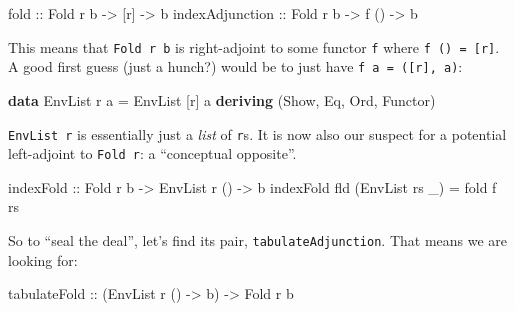 \documentclass[]{article}
\newenvironment{Shaded}{}{}
\newcommand{\DataTypeTok}[1]{\textcolor[rgb]{0.56,0.13,0.00}{#1}}
\newcommand{\KeywordTok}[1]{\textcolor[rgb]{0.00,0.44,0.13}{\textbf{#1}}}
\newcommand{\NormalTok}[1]{#1}
\newcommand{\OtherTok}[1]{\textcolor[rgb]{0.00,0.44,0.13}{#1}}
\begin{document}
\begin{Shaded}
\begin{Highlighting}[]
\OtherTok{fold            ::} \DataTypeTok{Fold}\NormalTok{ r b }\OtherTok{{-}>}\NormalTok{ [r]  }\OtherTok{{-}>}\NormalTok{ b}
\OtherTok{indexAdjunction ::} \DataTypeTok{Fold}\NormalTok{ r b }\OtherTok{{-}>}\NormalTok{ f () }\OtherTok{{-}>}\NormalTok{ b}
\end{Highlighting}
\end{Shaded}

This means that \texttt{Fold\ r\ b} is right-adjoint to some functor \texttt{f}
where \texttt{f\ ()\ =\ {[}r{]}}. A good first guess (just a hunch?) would be to
just have \texttt{f\ a\ =\ ({[}r{]},\ a)}:

\begin{Shaded}
\begin{Highlighting}[]
\KeywordTok{data} \DataTypeTok{EnvList}\NormalTok{ r a }\OtherTok{=} \DataTypeTok{EnvList}\NormalTok{ [r] a}
  \KeywordTok{deriving}\NormalTok{ (}\DataTypeTok{Show}\NormalTok{, }\DataTypeTok{Eq}\NormalTok{, }\DataTypeTok{Ord}\NormalTok{, }\DataTypeTok{Functor}\NormalTok{)}
\end{Highlighting}
\end{Shaded}

\texttt{EnvList\ r} is essentially just a \emph{list} of \texttt{r}s. It is now
also our suspect for a potential left-adjoint to \texttt{Fold\ r}: a
``conceptual opposite''.

\begin{Shaded}
\begin{Highlighting}[]
\OtherTok{indexFold ::} \DataTypeTok{Fold}\NormalTok{ r b }\OtherTok{{-}>} \DataTypeTok{EnvList}\NormalTok{ r () }\OtherTok{{-}>}\NormalTok{ b}
\NormalTok{indexFold fld (}\DataTypeTok{EnvList}\NormalTok{ rs \_) }\OtherTok{=}\NormalTok{ fold f rs}
\end{Highlighting}
\end{Shaded}

So to ``seal the deal'', let's find its pair, \texttt{tabulateAdjunction}. That
means we are looking for:

\begin{Shaded}
\begin{Highlighting}[]
\OtherTok{tabulateFold ::}\NormalTok{ (}\DataTypeTok{EnvList}\NormalTok{ r () }\OtherTok{{-}>}\NormalTok{ b) }\OtherTok{{-}>} \DataTypeTok{Fold}\NormalTok{ r b}
\end{Highlighting}
\end{Shaded}
\end{document}
